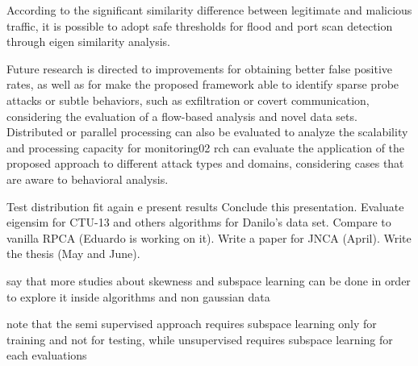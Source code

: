 According to the significant similarity difference between legitimate and malicious traffic, it is possible to adopt safe thresholds for flood and port scan detection through eigen similarity analysis.

Future research is directed to improvements for obtaining better false positive rates, as well as for make the proposed framework able to identify sparse probe attacks or subtle behaviors, such as exfiltration or covert communication, considering the evaluation of a flow-based analysis and novel data sets. Distributed or parallel processing can also be evaluated to analyze the scalability and processing capacity for monitoring02       rch can evaluate the application of the proposed approach to different attack types and domains, considering cases that are aware to behavioral analysis.

Test distribution fit again e present results 
Conclude this presentation.
Evaluate eigensim for CTU-13 and others algorithms for Danilo's data set.
Compare to vanilla RPCA (Eduardo is working on it).
Write a paper for JNCA (April).
Write the thesis (May and June).

say that more studies about skewness and subspace learning can be done in order to explore it inside algorithms and non gaussian data

note that the semi supervised approach requires subspace learning only for training and not for testing, while unsupervised requires subspace learning for each evaluations
